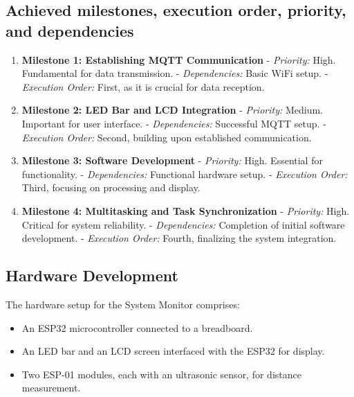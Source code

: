\documentclass{article}
\begin{document}
\subsection{Achieved milestones, execution order, priority, and dependencies}
\begin{enumerate}
    \item \textbf{Milestone 1: Establishing MQTT Communication}
       - \textit{Priority:} High. Fundamental for data transmission.
       - \textit{Dependencies:} Basic WiFi setup.
       - \textit{Execution Order:} First, as it is crucial for data reception.

    \item \textbf{Milestone 2: LED Bar and LCD Integration}
       - \textit{Priority:} Medium. Important for user interface.
       - \textit{Dependencies:} Successful MQTT setup.
       - \textit{Execution Order:} Second, building upon established communication.

    \item \textbf{Milestone 3: Software Development}
       - \textit{Priority:} High. Essential for functionality.
       - \textit{Dependencies:} Functional hardware setup.
       - \textit{Execution Order:} Third, focusing on processing and display.

    \item \textbf{Milestone 4: Multitasking and Task Synchronization}
       - \textit{Priority:} High. Critical for system reliability.
       - \textit{Dependencies:} Completion of initial software development.
       - \textit{Execution Order:} Fourth, finalizing the system integration.
\end{enumerate}

\subsection{Hardware Development}
The hardware setup for the System Monitor comprises:
\begin{itemize}
    \item An ESP32 microcontroller connected to a breadboard.
    \item An LED bar and an LCD screen interfaced with the ESP32 for display.
    \item Two ESP-01 modules, each with an ultrasonic sensor, for distance measurement.
\end{itemize}
\end{document}
